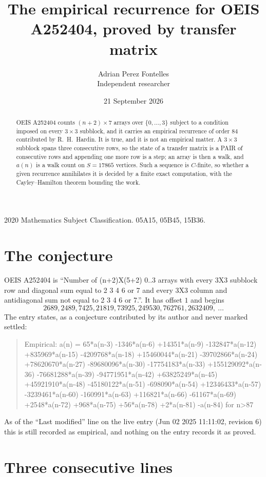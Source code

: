 \documentclass[11pt,a4paper]{article}
\title{The empirical recurrence for OEIS A252404, proved by transfer matrix}
\author{Adrian Perez Fontelles\\ \small Independent researcher}
\date{21 September 2026}
\theoremstyle{plain}
\theoremstyle{definition}
\begin{document}
\maketitle

\begin{abstract}
OEIS A252404 counts $(n+2)\times7$ arrays over $\{0,\dots,3\}$ subject to a condition imposed on
every $3\times3$ subblock, and it carries an empirical recurrence of order $84$
contributed by R.~H.~Hardin. It is true, and it is not an empirical matter. A $3\times3$
subblock spans three consecutive rows, so the state of a transfer matrix is a PAIR of
consecutive rows and appending one more row is a step; an array is then a walk, and
$a(n)$ is a walk count on $S=17865$ vertices. Such a sequence is $C$-finite, so whether a given
recurrence annihilates it is decided by a finite exact computation, with the Cayley--Hamilton
theorem bounding the work.
\end{abstract}

\noindent\small 2020 Mathematics Subject Classification. 05A15, 05B45, 15B36.\normalsize

\section{The conjecture}

OEIS A252404 is ``Number of (n+2)X(5+2) 0..3 arrays with every 3X3 subblock row and diagonal sum equal to 2 3 4 6 or 7 and every 3X3 column and antidiagonal sum not equal to 2 3 4 6 or 7.''. It has offset $1$ and begins
\[
2689, 2489, 7425, 21819, 73925, 249530, 762761, 2632409,\ \dots
\]
The entry states, as a conjecture contributed by its author and never marked settled:
\begin{quote}
Empirical: a(n) = 65*a(n-3) -1346*a(n-6) +14351*a(n-9) -132847*a(n-12) +835969*a(n-15) -4209768*a(n-18) +15460044*a(n-21) -39702866*a(n-24) +78620670*a(n-27) -89680096*a(n-30) -17754183*a(n-33) +155129092*a(n-36) -76681288*a(n-39) -94771951*a(n-42) +63825249*a(n-45) +45921910*a(n-48) -45180122*a(n-51) -698090*a(n-54) +12346433*a(n-57) -3239461*a(n-60) -160991*a(n-63) +116821*a(n-66) -61167*a(n-69) +2548*a(n-72) +968*a(n-75) +56*a(n-78) +2*a(n-81) -a(n-84) for n>87
\end{quote}
As of the ``Last modified'' line on the live entry (Jun 02 2025 11:11:02, revision 6) this is still
recorded as empirical, and nothing on the entry records it as proved.

\section{Three consecutive lines}
\end{document}
